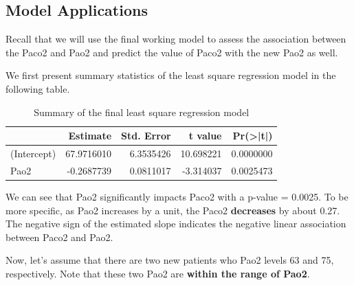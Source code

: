 \documentclass[
]{book}
\newenvironment{Shaded}{\begin{snugshade}}{\end{snugshade}}
\newcommand{\AttributeTok}[1]{\textcolor[rgb]{0.13,0.29,0.53}{#1}}
\newcommand{\FunctionTok}[1]{\textcolor[rgb]{0.13,0.29,0.53}{\textbf{#1}}}
\newcommand{\NormalTok}[1]{#1}
\newcommand{\OtherTok}[1]{\textcolor[rgb]{0.56,0.35,0.01}{#1}}
\newcommand{\SpecialCharTok}[1]{\textcolor[rgb]{0.81,0.36,0.00}{\textbf{#1}}}
\newcommand{\StringTok}[1]{\textcolor[rgb]{0.31,0.60,0.02}{#1}}
\begin{document}
\hypertarget{model-applications}{%
\subsection{Model Applications}\label{model-applications}}

Recall that we will use the final working model to assess the association between the Paco2 and Pao2 and predict the value of Paco2 with the new Pao2 as well.

We first present summary statistics of the least square regression model in the following table.

\begin{Shaded}
\end{Shaded}

\begin{table}

\caption{\label{tab:unnamed-chunk-148}Summary of the final least square regression model}
\centering
\begin{tabular}[t]{l|r|r|r|r}
\hline
  & Estimate & Std. Error & t value & Pr(>|t|)\\
\hline
(Intercept) & 67.9716010 & 6.3535426 & 10.698221 & 0.0000000\\
\hline
Pao2 & -0.2687739 & 0.0811017 & -3.314037 & 0.0025473\\
\hline
\end{tabular}
\end{table}

We can see that Pao2 significantly impacts Paco2 with a p-value = 0.0025. To be more specific, as Pao2 increases by a unit, the Paco2 \textbf{decreases} by about 0.27. The negative sign of the estimated slope indicates the negative linear association between Paco2 and Pao2.

Now, let's assume that there are two new patients who Pao2 levels 63 and 75, respectively. Note that these two Pao2 are \textbf{within the range of Pao2}.
\end{document}
